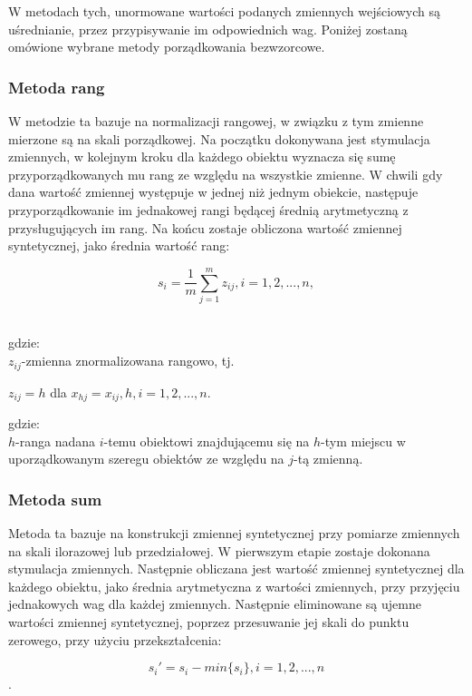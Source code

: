 \documentclass[12pt,a4paper]{report}
\begin{document}
W metodach tych, unormowane wartości podanych zmiennych wejściowych są uśrednianie, przez przypisywanie im odpowiednich wag. 
Poniżej zostaną omówione wybrane metody porządkowania bezwzorcowe.

\subsubsection{Metoda rang}
\noindent


W metodzie ta bazuje na normalizacji rangowej, w związku z tym zmienne mierzone są na skali porządkowej. Na początku dokonywana jest stymulacja zmiennych, w kolejnym kroku dla każdego obiektu wyznacza się sumę przyporządkowanych mu rang ze względu na wszystkie zmienne. W chwili gdy dana wartość zmiennej występuje w jednej niż jednym obiekcie, następuje przyporządkowanie im jednakowej rangi będącej średnią arytmetyczną z przysługujących im rang. Na końcu zostaje obliczona wartość zmiennej syntetycznej, jako średnia wartość rang:\\
\begin{center}
$$s_{i}=\frac{1}{m}\sum_{j=1}^{m} z_{ij}, i=1, 2, ..., n,$$\\
\end{center}
gdzie:\\
$z_{ij}$-zmienna znormalizowana rangowo, tj.
\begin{center}
$z_{ij}=h$ dla $x_{hj}=x_{ij}, h,i=1, 2, ..., n.$
\end{center}
gdzie:\\
$h$-ranga nadana $i$-temu obiektowi znajdującemu się na $h$-tym miejscu w uporządkowanym szeregu obiektów ze względu na $j$-tą zmienną.


\subsubsection{Metoda sum}
\noindent


Metoda ta bazuje na konstrukcji zmiennej syntetycznej przy pomiarze zmiennych na skali ilorazowej lub przedziałowej. W pierwszym etapie zostaje dokonana stymulacja zmiennych. Następnie obliczana jest wartość zmiennej syntetycznej dla każdego obiektu, jako średnia arytmetyczna z wartości zmiennych, przy przyjęciu jednakowych wag dla każdej zmiennych. Następnie eliminowane są ujemne wartości zmiennej syntetycznej, poprzez przesuwanie jej skali do punktu zerowego, przy użyciu przekształcenia:
\begin{center}
$$s_{i}'=s_{i}-min\{s_i\}, i=1, 2, ..., n$$.\\
\end{center}
\end{document}
